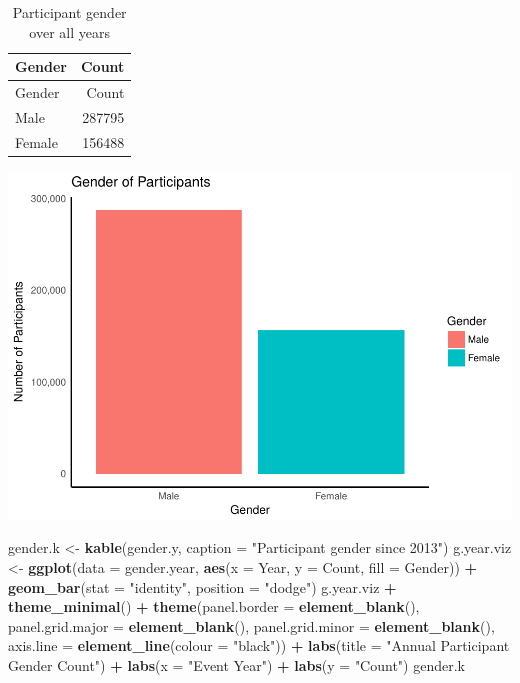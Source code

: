 \documentclass[]{article}
\newenvironment{Shaded}{\begin{snugshade}}{\end{snugshade}}
\newcommand{\KeywordTok}[1]{\textcolor[rgb]{0.13,0.29,0.53}{\textbf{#1}}}
\newcommand{\DataTypeTok}[1]{\textcolor[rgb]{0.13,0.29,0.53}{#1}}
\newcommand{\StringTok}[1]{\textcolor[rgb]{0.31,0.60,0.02}{#1}}
\newcommand{\OperatorTok}[1]{\textcolor[rgb]{0.81,0.36,0.00}{\textbf{#1}}}
\newcommand{\NormalTok}[1]{#1}
\begin{document}
\begin{longtable}[]{@{}lr@{}}
\caption{Participant gender over all years}\tabularnewline
\toprule
Gender & Count\tabularnewline
\midrule
\endfirsthead
\toprule
Gender & Count\tabularnewline
\midrule
\endhead
Male & 287795\tabularnewline
Female & 156488\tabularnewline
\bottomrule
\end{longtable}

\includegraphics{index_files/figure-latex/gender.ov-1.pdf}

\begin{Shaded}
\begin{Highlighting}[]
\NormalTok{gender.k <-}\StringTok{ }\KeywordTok{kable}\NormalTok{(gender.y, }\DataTypeTok{caption =} \StringTok{"Participant gender since 2013"}\NormalTok{)}
\NormalTok{g.year.viz <-}\StringTok{ }\KeywordTok{ggplot}\NormalTok{(}\DataTypeTok{data =}\NormalTok{ gender.year, }\KeywordTok{aes}\NormalTok{(}\DataTypeTok{x =}\NormalTok{ Year, }\DataTypeTok{y =}\NormalTok{ Count, }
    \DataTypeTok{fill =}\NormalTok{ Gender)) }\OperatorTok{+}\StringTok{ }\KeywordTok{geom_bar}\NormalTok{(}\DataTypeTok{stat =} \StringTok{"identity"}\NormalTok{, }\DataTypeTok{position =} \StringTok{"dodge"}\NormalTok{)}
\NormalTok{g.year.viz }\OperatorTok{+}\StringTok{ }\KeywordTok{theme_minimal}\NormalTok{() }\OperatorTok{+}\StringTok{ }\KeywordTok{theme}\NormalTok{(}\DataTypeTok{panel.border =} \KeywordTok{element_blank}\NormalTok{(), }
    \DataTypeTok{panel.grid.major =} \KeywordTok{element_blank}\NormalTok{(), }\DataTypeTok{panel.grid.minor =} \KeywordTok{element_blank}\NormalTok{(), }
    \DataTypeTok{axis.line =} \KeywordTok{element_line}\NormalTok{(}\DataTypeTok{colour =} \StringTok{"black"}\NormalTok{)) }\OperatorTok{+}\StringTok{ }\KeywordTok{labs}\NormalTok{(}\DataTypeTok{title =} \StringTok{"Annual Participant Gender Count"}\NormalTok{) }\OperatorTok{+}\StringTok{ }
\StringTok{    }\KeywordTok{labs}\NormalTok{(}\DataTypeTok{x =} \StringTok{"Event Year"}\NormalTok{) }\OperatorTok{+}\StringTok{ }\KeywordTok{labs}\NormalTok{(}\DataTypeTok{y =} \StringTok{"Count"}\NormalTok{)}
\NormalTok{gender.k}
\end{Highlighting}
\end{Shaded}
\end{document}
